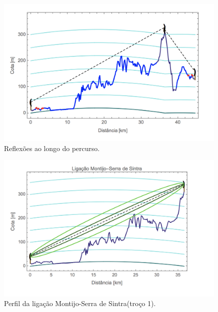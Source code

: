 \begin{figure}[H]
\includegraphics[scale=0.65]{reflexoes.png}
\centering
\caption{Reflexões ao longo do percurso.}
\label{reflexoes}
\end{figure}

\begin{figure}[H]
\centering
\includegraphics[scale=0.65]{perfil1.png}
\caption{Perfil da ligação Montijo-Serra de Sintra(troço 1).}
\label{perfil1}
\end{figure}

